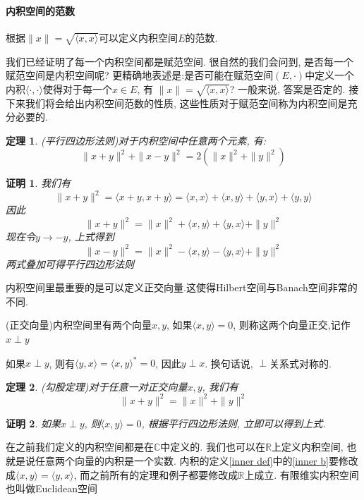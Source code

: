 \documentclass[a4paper,11pt]{article}
\theoremstyle{mystyle}
\newtheorem{theorem}{\hspace{2em}定理}[section]
\newtheorem{Proof}{\hspace{2em}证明}[section]
\begin{document}
\paragraph*{内积空间的范数}
\begin{definition}
  根据$\|x\|=\sqrt{\langle x,x\rangle}$可以定义内积空间$E$的范数.
\end{definition}
我们已经证明了每一个内积空间都是赋范空间. 很自然的我们会问到, 是否每一个赋范空间是内积空间呢? 更精确地表述是:是否可能在赋范空间$(E,\cdot)$中定义一个内积$\langle\cdot,\cdot\rangle$使得对于每一个$x\in E$, 有 $\|x\|=\sqrt{\langle x,x\rangle}$? 一般来说, 答案是否定的. 接下来我们将会给出内积空间范数的性质, 这些性质对于赋范空间称为内积空间是充分必要的.
\begin{theorem}
  (平行四边形法则)对于内积空间中任意两个元素, 有:
  \begin{equation*}
    \|x+y\|^2+\|x-y\|^2=2(\|x\|^2+\|y\|^2)
  \end{equation*}
\end{theorem}
\begin{Proof}
  我们有
  \begin{equation*}
    \|x+y\|^2=\langle x+y,x+y\rangle=\langle x,x\rangle+\langle x,y\rangle+\langle y,x\rangle+\langle y,y\rangle
  \end{equation*}
  因此
  \begin{equation*}
    \|x+y\|^2=\|x\|^2+\langle x,y\rangle+\langle y,x\rangle+\|y\|^2
  \end{equation*}
  现在令$y\to -y$, 上式得到
  \begin{equation*}
    \|x-y\|^2=\|x\|^2-\langle x,y\rangle-\langle y,x\rangle+\|y\|^2
  \end{equation*}
  两式叠加可得平行四边形法则
\end{Proof}
内积空间里最重要的是可以定义正交向量.这使得Hilbert空间与Banach空间非常的不同.
\begin{definition}
  (正交向量)内积空间里有两个向量$x,y$, 如果$\langle x,y\rangle=0$, 则称这两个向量正交,记作$x\perp y$
\end{definition}
如果$x\perp y$, 则有$\langle y,x\rangle=\langle x,y\rangle^*=0$, 因此$y\perp x$. 换句话说, $\perp$关系式对称的.
\begin{theorem}
  (勾股定理)对于任意一对正交向量$x,y$, 我们有
  \begin{equation*}
    \|x+y\|^2=\|x\|^2+\|y\|^2
  \end{equation*}
\end{theorem}
\begin{Proof}
  如果$x\perp y$, 则$\langle x,y\rangle=0$, 根据平行四边形法则, 立即可以得到上式.
\end{Proof}
在之前我们定义的内积空间都是在$\mathbb{C}$中定义的. 我们也可以在$\mathbb{R}$上定义内积空间, 也就是说任意两个向量的内积是一个实数. 内积的定义\ref{inner def}中的\ref{inner b}要修改成$\langle x,y\rangle=\langle y,x\rangle$, 而之前所有的定理和例子都要修改成$\mathbb{R}$上成立. 有限维实内积空间也叫做Euclidean空间
\end{document}
